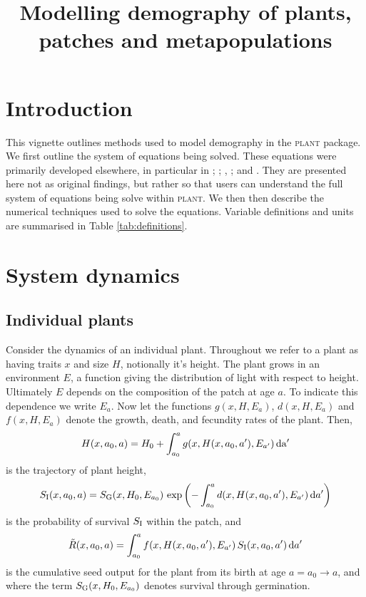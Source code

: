 \documentclass[10pt,twoside]{article}
\title{Modelling demography of plants, patches and metapopulations}
\date{}
\newcommand{\plant}{\textsc{plant}}
\begin{document}
\maketitle

\tableofcontents

\section{Introduction}

This vignette outlines methods used to model demography in the {\plant}
package. We first outline the system of equations being solved. These equations were primarily
developed elsewhere, in particular in
\citet{Deroos-1997}; \citet{Kohyama-1993}; \citet{Moorcroft-2001}, \citet{Falster-2011}; and
\citet{Falster-2015}. They are presented here not as original findings, but rather so that
users can understand the full system of equations being solve within {\plant}.
We then then describe the numerical techniques used to solve the equations.
Variable definitions and units are
summarised in Table \ref{tab:definitions}.

\section{System dynamics}\label{system-dynamics}

\subsection{Individual plants}\label{individual-plants}

Consider the dynamics of an individual plant. Throughout we refer to a
plant as having traits \(x\) and size \(H\), notionally it's height. The
plant grows in an environment \(E\), a function giving the distribution
of light with respect to height. Ultimately \(E\) depends on the
composition of the patch at age \(a\). To indicate this dependence we
write \(E_a\). Now let the functions \(g(x, H, E_a)\), \(d(x, H, E_a)\) and
\(f(x, H, E_a)\) denote the growth, death, and fecundity rates of the
plant. Then,
\begin{equation} \label{eq:size}
  H(x, a_0, a) = H_0 + \int_{a_0}^{a} g(x, H(x, a_0, a^\prime), E_{a^\prime}) \, \rm{d}a^\prime
\end{equation}
is the trajectory of plant height,
\begin{equation} \label{eq:survivalIndividual}
  S_{\rm I} (x, a_0, a) = S_{\rm G} (x, H_0, E_{a_0}) \, \exp\left(- \int_{a_0}^{a} d(x, H(x, a_0, a^\prime), E_{a^\prime}) \, {\rm d} a^\prime \right)
\end{equation}
is the probability of survival \(S_{\rm I}\) within the patch, and
\begin{equation} \label{eq:tildeR1}
  \tilde{R}(x, a_0, a) = \int_{a_0}^{a} f(x, H(x, a_0, a^\prime), E_{a^\prime}) \, S_{\rm I} (x, a_0, a^\prime) \, {\rm d} a^\prime
\end{equation}
is the cumulative seed output for the plant from its birth at age
\(a = a_0 \rightarrow a\), and where the term \(S_{\rm G} (x, H_0, E_{a_0})\)
denotes survival through germination.
\end{document}

